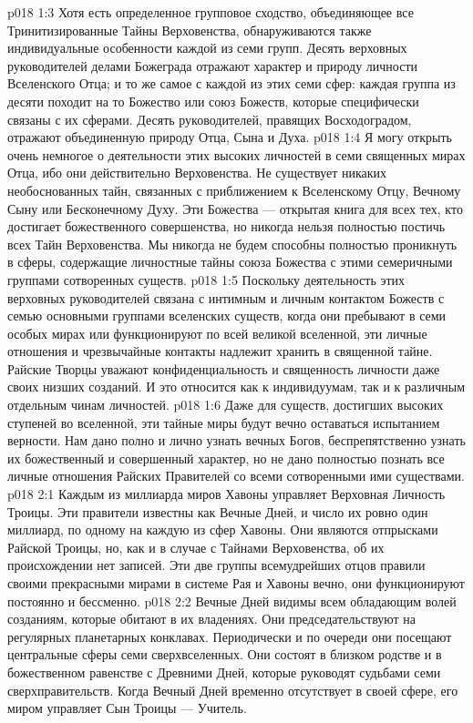 \vs p018 1:3 Хотя есть определенное групповое сходство, объединяющее все Тринитизированные Тайны Верховенства, обнаруживаются также индивидуальные особенности каждой из семи групп. Десять верховных руководителей делами Божеграда отражают характер и природу личности Вселенского Отца; и то же самое с каждой из этих семи сфер: каждая группа из десяти походит на то Божество или союз Божеств, которые специфически связаны с их сферами. Десять руководителей, правящих Восходоградом, отражают объединенную природу Отца, Сына и Духа.
\vs p018 1:4 \pc Я могу открыть очень немногое о деятельности этих высоких личностей в семи священных мирах Отца, ибо они действительно  Верховенства. Не существует никаких необоснованных тайн, связанных с приближением к Вселенскому Отцу, Вечному Сыну или Бесконечному Духу. Эти Божества --- открытая книга для всех тех, кто достигает божественного совершенства, но никогда нельзя полностью постичь всех Тайн Верховенства. Мы никогда не будем способны полностью проникнуть в сферы, содержащие личностные тайны союза Божества с этими семеричными группами сотворенных существ.
\vs p018 1:5 Поскольку деятельность этих верховных руководителей связана с интимным и личным контактом Божеств с семью основными группами вселенских существ, когда они пребывают в семи особых мирах или функционируют по всей великой вселенной, эти личные отношения и чрезвычайные контакты надлежит хранить в священной тайне. Райские Творцы уважают конфиденциальность и священность личности даже своих низших созданий. И это относится как к индивидуумам, так и к различным отдельным чинам личностей.
\vs p018 1:6 Даже для существ, достигших высоких ступеней во вселенной, эти тайные миры будут вечно оставаться испытанием верности. Нам дано полно и лично узнать вечных Богов, беспрепятственно узнать их божественный и совершенный характер, но не дано полностью познать все личные отношения Райских Правителей со всеми сотворенными ими существами.
\vs p018 2:1 Каждым из миллиарда миров Хавоны управляет Верховная Личность Троицы. Эти правители известны как Вечные Дней, и число их ровно один миллиард, по одному на каждую из сфер Хавоны. Они являются отпрысками Райской Троицы, но, как и в случае с Тайнами Верховенства, об их происхождении нет записей. Эти две группы всемудрейших отцов правили своими прекрасными мирами в системе Рая и Хавоны вечно, они функционируют постоянно и бессменно.
\vs p018 2:2 Вечные Дней видимы всем обладающим волей созданиям, которые обитают в их владениях. Они председательствуют на регулярных планетарных конклавах. Периодически и по очереди они посещают центральные сферы семи сверхвселенных. Они состоят в близком родстве и в божественном равенстве с Древними Дней, которые руководят судьбами семи сверхправительств. Когда Вечный Дней временно отсутствует в своей сфере, его миром управляет Сын Троицы --- Учитель.
